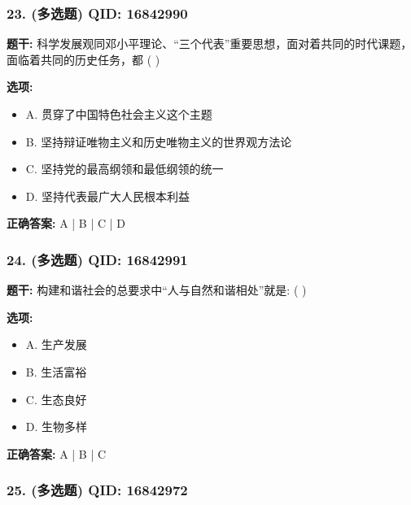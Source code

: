 \documentclass[12pt,UTF8]{ctexart}
\begin{document}
\subsubsection*{23. (多选题) \small QID: 16842990}

\textbf{题干:}
科学发展观同邓小平理论、“三个代表”重要思想，面对着共同的时代课题，面临着共同的历史任务，都 ( )

\textbf{选项:}
\begin{itemize}[leftmargin=*]

  \item A. 贯穿了中国特色社会主义这个主题

  \item B. 坚持辩证唯物主义和历史唯物主义的世界观方法论

  \item C. 坚持党的最高纲领和最低纲领的统一

  \item D. 坚持代表最广大人民根本利益

\end{itemize}

\textbf{正确答案:}
A | B | C | D

\vspace{0.3em}\hrulefill\vspace{0.7em}

\subsubsection*{24. (多选题) \small QID: 16842991}

\textbf{题干:}
构建和谐社会的总要求中“人与自然和谐相处”就是: ( )

\textbf{选项:}
\begin{itemize}[leftmargin=*]

  \item A. 生产发展

  \item B. 生活富裕

  \item C. 生态良好

  \item D. 生物多样

\end{itemize}

\textbf{正确答案:}
A | B | C

\vspace{0.3em}\hrulefill\vspace{0.7em}

\subsubsection*{25. (多选题) \small QID: 16842972}
\end{document}
